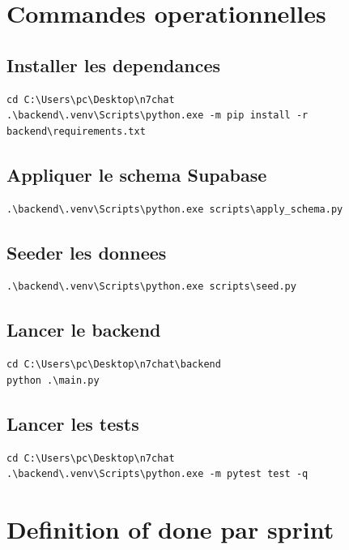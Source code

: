 \documentclass[11pt,a4paper]{article}
\begin{document}
\section{Commandes operationnelles}

\subsection{Installer les dependances}

\begin{lstlisting}
cd C:\Users\pc\Desktop\n7chat
.\backend\.venv\Scripts\python.exe -m pip install -r backend\requirements.txt
\end{lstlisting}

\subsection{Appliquer le schema Supabase}

\begin{lstlisting}
.\backend\.venv\Scripts\python.exe scripts\apply_schema.py
\end{lstlisting}

\subsection{Seeder les donnees}

\begin{lstlisting}
.\backend\.venv\Scripts\python.exe scripts\seed.py
\end{lstlisting}

\subsection{Lancer le backend}

\begin{lstlisting}
cd C:\Users\pc\Desktop\n7chat\backend
python .\main.py
\end{lstlisting}

\subsection{Lancer les tests}

\begin{lstlisting}
cd C:\Users\pc\Desktop\n7chat
.\backend\.venv\Scripts\python.exe -m pytest test -q
\end{lstlisting}

\section{Definition of done par sprint}
\end{document}
